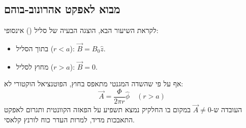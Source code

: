\subsection{מבוא לאפקט אהרונוב-בוהם}
לקראת השיעור הבא, הוצגה הבעיה של סליל () אינסופי:
\begin{itemize}
    \item בתוך הסליל ($r < a$): $\vec{B} = B_0 \hat{z}$.
    \item מחוץ לסליל ($r > a$): $\vec{B} = 0$.
\end{itemize}
אף על פי שהשדה המגנטי מתאפס בחוץ, הפוטנציאל הוקטורי לא:
\begin{equation}
\vec{A} = \frac{\Phi}{2\pi r} \hat{\phi} \quad (r > a)
\end{equation}
העובדה ש-$\vec{A} \neq 0$ במקום בו החלקיק נמצא תשפיע על הפאזה הקוונטית ותגרום לאפקט התאבכות מדיד, למרות העדר כוח לורנץ קלאסי.